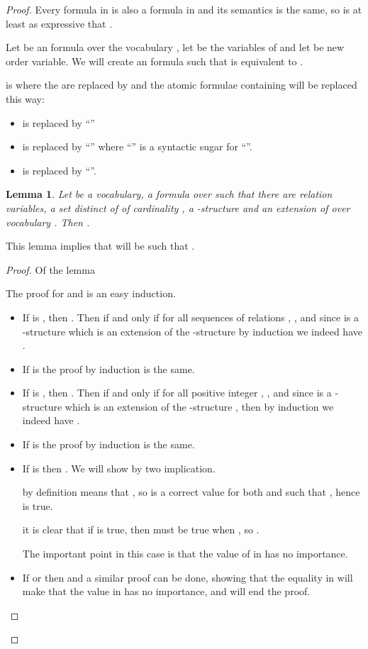 \documentclass[a4paper,12pt]{article}
\newtheorem{lemma}[theorem]{Lemma}
\theoremstyle{definition}
\begin{document}
\begin{proof}Every formula in  is also a formula in \VO{} and
  its semantics is the same, so \VO{} is at least as expressive that
  .

  Let  be an \VO{} formula over the vocabulary , let
   be the variables of  and let
   be  new order variable. We will
  create an  formula  such that  is equivalent to .

   is  where the  are replaced by  and the atomic formulae containing  will be
  replaced this way:
  \begin{itemize}
  \item  is replaced by ``''
  \item{} is
    replaced by ``'' where
    ``'' is a syntactic sugar for ``''.
  \item{} is replaced by ``''.

  \end{itemize}

  \begin{lemma}Let  be a vocabulary,  a formula over
     such that there are  relation variables,  a
    set distinct of  of cardinality ,  a
    -structure and  an extension of  over
    vocabulary . Then .
\end{lemma}
This lemma implies that  will be such
that .

\begin{proof}Of the lemma
  
  The proof for  and  is an easy induction.
  \begin{itemize}
  \item If  is , then .  Then  if and only if for all sequences of relations , , and since  is a
    -structure which is an extension
    of the -structure  by
    induction we indeed have .
  \item If  is  the proof by induction is the
    same.
  \item If  is , then . Then  if and only if for all positive integer , , and
    since  is a -structure which
    is an extension of the -structure ,
    then by induction  we indeed have .
  \item If  is  the proof by induction is the
    same.
  \item If  is  then . We
    will show  by
    two implication.

     by definition  means that , so  is a correct value for both
     and  such that , hence  is true.

     it is clear that if  is
    true, then  must be true
    when , so .

    The important point in this case is that the value of  in
     has no importance.
  \item If 
    or  then  and a
    similar proof can be done, showing that the equality in 
    will make that the value in  has no importance, and will
    end the proof.
  \end{itemize}
\end{proof}
\end{proof}
\end{document}
